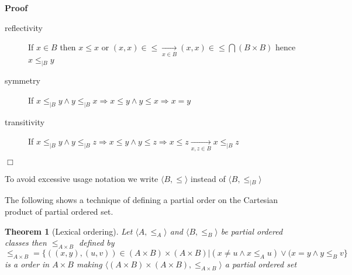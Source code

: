 \documentclass{book}
\newcommand{\Rightarrowlim}{\mathop{\rightarrow}\limits}
\newcommand{\nobracket}{}
\newenvironment{proof}{\noindent\textbf{Proof\ }}{\hspace*{\fill}$\Box$\medskip}
\newtheorem{theorem}{Theorem}
\begin{document}
\begin{proof}
  
  \begin{description}
    \item[reflectivity] If $x \in B$ then $x \leqslant x$ or $(x, x) \in
    \leqslant \Rightarrowlim_{x \in B} (x, x) \in \leqslant \bigcap (B \times
    B)$ hence $x \leqslant_{|B} y$
    
    \item[symmetry] If $x \leqslant_{| B \nobracket} y \wedge y \leqslant_{| B
    \nobracket} x \Rightarrow x \leqslant y \wedge y \leqslant x \Rightarrow x
    = y$
    
    \item[transitivity] If $x \leqslant_{| B \nobracket} y \wedge y
    \leqslant_{| B \nobracket} z \Rightarrow x \leqslant y \wedge y \leqslant
    z \Rightarrow x \leqslant z \Rightarrowlim_{x, z \in B} x \leqslant_{| B
    \nobracket} z$
  \end{description}
\end{proof}

\begin{convention}
  To avoid excessive usage notation we write $\langle B, \leqslant \rangle$
  instead of $\langle B, \leqslant_{|B} \rangle$
\end{convention}

The following shows a technique of defining a partial order on the Cartesian
product of partial ordered set.

\begin{theorem}[Lexical ordering]
  \label{order lexical order}Let $\langle A, \leqslant_A \rangle$ and $\langle
  B, \leqslant_B \rangle$ be partial ordered classes then $\leqslant_{A \times
  B}$ defined by
  \[ \leqslant_{A \times B} = \{ ((x, y), (u, v)) \in (A \times B) \times (A
     \times B) | (x \neq u \wedge x \leqslant_A u) \vee (x = y \wedge y
     \leqslant_B v \} \nobracket \]
  is a order in $A \times B$ making $\langle (A \times B) \times (A \times B),
  \leqslant_{A \times B} \rangle$ a partial ordered set
\end{theorem}
\end{document}
